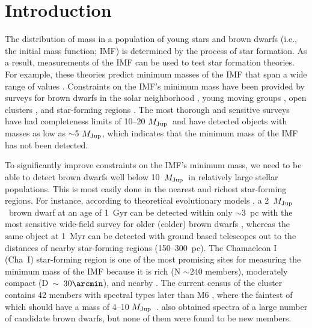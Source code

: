 \documentclass{emulateapj}
\def\mjup{$M_{\rm Jup}$}
\begin{document}

\section{Introduction}

The distribution of mass in a population of young stars and brown dwarfs 
(i.e., the initial mass function; IMF) is determined by the process of star
formation. As a result, measurements of the IMF can be used to test star
formation theories. For example, these theories predict 
minimum masses of the IMF that span a wide range of values 
\citep[1--100 \mjup,][references therein]{low76,lar92,whi07}. 
Constraints on the IMF's minimum mass have been provided by surveys for
brown dwarfs in the solar neighborhood \citep[][]{kir12},
young moving groups \citep[][]{gag15}, open clusters \citep[][]{mor04}, 
and star-forming regions \citep[][]{luh09,pen12,lod13,alv13}. 
The most thorough and sensitive surveys have had completeness limits of 
10--20 \mjup\ and have detected objects with masses as low as $\sim$5 \mjup, 
which indicates that the minimum mass of the IMF has not been detected. 

To significantly improve constraints on the IMF's minimum mass,
we need to be able to detect brown dwarfs well below 10~\mjup\ in 
relatively large stellar populations.
This is most easily done in the nearest and richest star-forming regions. 
For instance, according to theoretical evolutionary models \citep{bur97,bur03},
a 2~\mjup\ brown dwarf at an age of 1~Gyr can be detected within only
$\sim$3~pc with the most sensitive wide-field survey for older (colder)
brown dwarfs \citep{wri10}, 
whereas the same object at 1~Myr can be detected with ground based telescopes 
out to the distances of nearby star-forming regions (150--300~pc).
The Chamaeleon I (Cha~I) star-forming region is one of the most promising sites 
for measuring the minimum mass of the IMF because it is rich (N $\sim240$
members), moderately compact (D~$\sim$~$30\arcmin$), and nearby 
\citep[160--170 pc,][]{luhm08}. The current census of the cluster contains
42 members with spectral types later than M6
\citep[$<$0.1~M$_\odot$,][]{neu99,com99,com00,com04,luhm04,luhm07,luh04,luh06,luh08,luhM08,sch08},
where the faintest of which should have a mass of 4--10 \mjup\ \citep{luh08}. 
\cite{muz11,muz15} also obtained spectra of a large number of candidate 
brown dwarfs, but none of them were found to be new members. 
\end{document}
